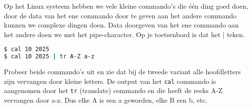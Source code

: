 Op het Linux systeem hebben we vele kleine commando's die \'e\'en ding goed doen, door de data van het ene commando door te geven aan het andere commando kunnen we complexe dingen doen. Data doorgeven van het ene commando aan het andere doen we met het pipe-character. Op je toetsenbord is dat het | teken.

\begin{lstlisting}[language=bash]
$ cal 10 2025
$ cal 10 2025 | tr A-Z a-z
\end{lstlisting}
Probeer beide commando's uit en zie dat bij de tweede variant alle hoofdletters zijn vervangen door kleine letters. De output van het \texttt{cal} commando is aangenomen door het \texttt{tr} (translate) commando en die heeft de reeks A-Z vervangen door a-z. Dus elke A is een a geworden, elke B een b, etc.
 
